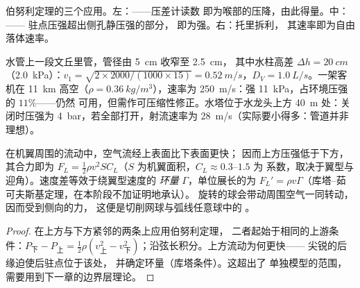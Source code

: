 \begin{omfigure}
{\small 伯努利定理的三个应用。左：——压差计读数
即为喉部的压降，由此得量。中：——
驻点压强超出侧孔静压强的部分，
即为强。右：托里拆利，
其速率即为自由落体速率。}
\end{omfigure}

\begin{example}[数值]\label{ex:b2:euler-bernoulli:numbers}
水管上一段文丘里管，管径由 \qty{5}{cm} 收窄至 \qty{2.5}{cm}，
其中水柱高差 $\Delta h = \qty{20}{cm}$（\qty{2.0}{kPa}）：$v_1 = \sqrt{2 \times 2000/
(1000 \times 15)} = \qty{0.52}{m/s}$，$D_V = \qty{1.0}{L/s}$。一架客机在
\qty{11}{km} 高空（$\rho = \qty{0.36}{kg/m^3}$），速率为 \qty{250}{m/s}：强
\qty{11}{kPa}，占环境压强的 $11\%$——仍然
可用，但需作可压缩性修正。水塔位于水龙头上方 \qty{40}{m}
处：关闭时压强为 \qty{4}{bar}，若全部打开，射流速率为
\qty{28}{m/s}（实际要小得多：管道并非理想）。
\end{example}

\begin{proposition}[机翼升力]\label{prop:b2:euler-bernoulli:lift}
在机翼周围的流动中，空气流经上表面比下表面更快；
因而上方压强低于下方，其合力即为\emph{} $F_L =
\tfrac12\rho v^2SC_L$（$S$ 为机翼面积，$C_L \approx 0.3$--$1.5$ 为
系数，取决于翼型与迎角）。速度差等效于绕翼型速度的
\emph{环量} $\Gamma$，单位展长的为 $F_L' =
\rho v\Gamma$（库塔–茹可夫斯基定理，在本阶段不加证明地承认）。
旋转的球会带动周围空气一同转动，
因而受到侧向的力，
这便是切削网球与弧线任意球中的
\emph{}。
\end{proposition}

\begin{proof}
在上方与下方紧邻的两条上应用伯努利定理，
二者起始于相同的上游条件：$P_{\text{下}} - P_{\text{上}} = \tfrac12\rho
(v_{\text{上}}^2 - v_{\text{下}}^2)$；沿弦长积分。上方流动为何更快——
尖锐的后缘迫使后驻点位于该处，
并确定环量（库塔条件）。这超出了
单独模型的范围，
需要用到下一章的边界层理论。
\end{proof}

